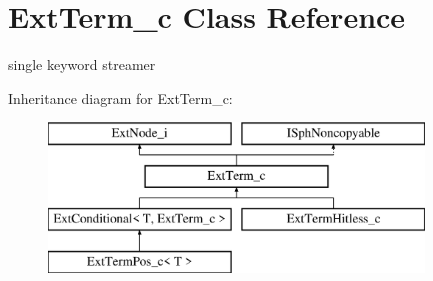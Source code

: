 \hypertarget{classExtTerm__c}{\section{Ext\-Term\-\_\-c Class Reference}
\label{classExtTerm__c}
}


single keyword streamer  


Inheritance diagram for Ext\-Term\-\_\-c\-:\begin{figure}[H]
\begin{center}
\leavevmode
\includegraphics[height=4.000000cm]{classExtTerm__c}
\end{center}
\end{figure}
